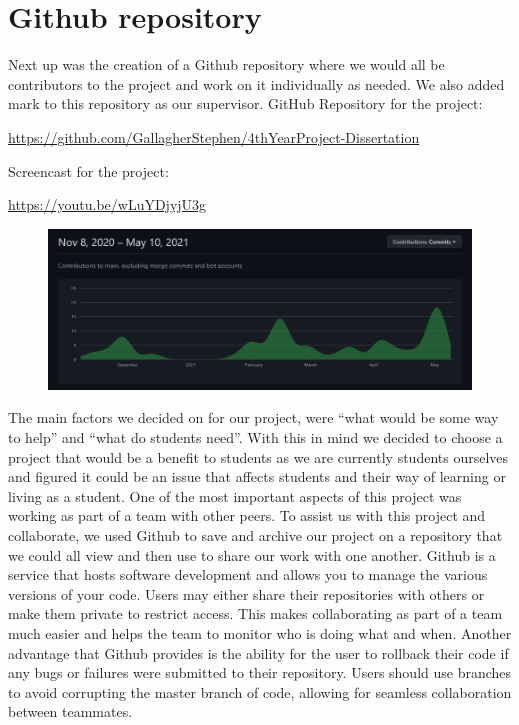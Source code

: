 \section{Github repository}

Next up was the creation of a Github repository where we would all be contributors to the project and work on it individually as needed. We also added mark to this repository as our supervisor. \hfill \break  
\hfill \break
GitHub Repository for the project:

\url{https://github.com/GallagherStephen/4thYearProject-Dissertation}

\hfill \break
Screencast for the project:

\url{https://youtu.be/wLuYDjyjU3g}

\hfill \break
\begin{figure}
    \centering
    \includegraphics[width=.6\textwidth, inner]{images/graph.png}
    \caption{ }
    \label{fig:my_label}
\end{figure}

\hfill \break
The main factors we decided on for our project, were “what would be some way to help” and “what do students need”. With this in mind we decided to choose a project that would be a benefit to students as we are currently students ourselves and figured it could be an issue that affects students and their way of learning or living as a student.
One of the most important aspects of this project was working as part of a team with other peers.\hfill \break
\hfill \break
To assist us with this project and collaborate, we used Github\cite{ref5} to save and archive our project on a repository that we could all view and then use to share our work with one another. Github is a service that hosts software development and allows you to manage the various versions of your code. Users may either share their repositories with others or make them private to restrict access. This makes collaborating as part of a team much easier and helps the team to monitor who is doing what and when. Another advantage that Github provides is the ability for the user to rollback their code if any bugs or failures were submitted to their repository. Users should use branches to avoid corrupting the master branch of code, allowing for seamless collaboration between teammates.

